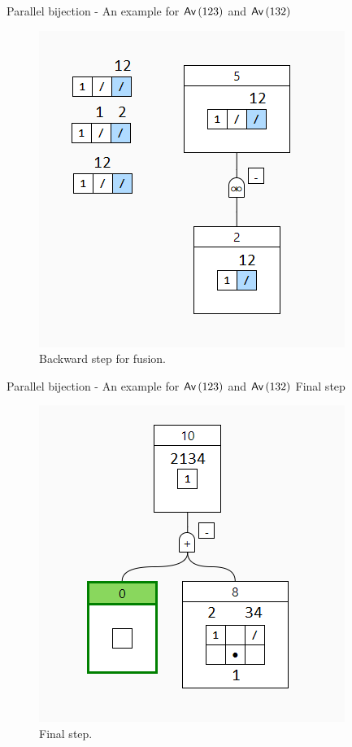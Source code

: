 
\begin{frame}{Parallel bijection - An example for $\textsf{Av}\left(123\right)$ and $\textsf{Av}\left(132\right)$}
    \begin{figure}
        \centering
        \includegraphics[scale=0.4]{graphics/fus_back.png}
        \caption{Backward step for fusion.}
    \end{figure}
\end{frame}
\begin{frame}{Parallel bijection - An example for $\textsf{Av}\left(123\right)$ and $\textsf{Av}\left(132\right)$}
    Final step
    \begin{figure}
        \centering
        \includegraphics[scale=0.4]{graphics/final_parse.png}
        \caption{Final step.}
    \end{figure}
\end{frame}